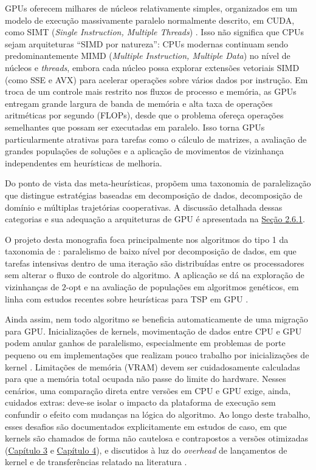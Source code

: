 GPUs oferecem milhares de núcleos relativamente simples, organizados em um modelo de execução massivamente paralelo normalmente descrito, em CUDA, como SIMT (\emph{Single Instruction, Multiple Threads}) \autocite{flynn1972taxonomy,nvidia2024cuda}.
Isso não significa que CPUs sejam arquiteturas ``SIMD por natureza'': CPUs modernas continuam sendo predominantemente MIMD (\emph{Multiple Instruction, Multiple Data}) no nível de núcleos e \emph{threads}, embora cada núcleo possa explorar extensões vetoriais SIMD (como SSE e AVX) para acelerar operações sobre vários dados por instrução.
Em troca de um controle mais restrito nos fluxos de processo e memória, as GPUs entregam grande largura de banda de memória e alta taxa de operações aritméticas por segundo (FLOPs), desde que o problema ofereça operações semelhantes que possam ser executadas em paralelo.
Isso torna GPUs particularmente atrativas para tarefas como o cálculo de matrizes, a avaliação de grandes populações de soluções e a aplicação de movimentos de vizinhança independentes em heurísticas de melhoria.

Do ponto de vista das meta-heurísticas, \textcite{crainic2003parallel} propõem uma taxonomia de paralelização que distingue estratégias baseadas em decomposição de dados, decomposição de domínio e múltiplas trajetórias cooperativas.
A discussão detalhada dessas categorias e sua adequação a arquiteturas de GPU é apresentada na \hyperref[sec-261-taxonomia-paralelizacao]{Seção 2.6.1}.

O projeto desta monografia foca principalmente nos algoritmos do tipo 1 da taxonomia de \textcite{crainic2003parallel}: paralelismo de baixo nível por decomposição de dados, em que tarefas intensivas dentro de uma iteração são distribuídas entre os processadores sem alterar o fluxo de controle do algoritmo.
A aplicação se dá na exploração de vizinhanças de \(2\)-opt e na avaliação de populações em algoritmos genéticos, em linha com estudos recentes sobre heurísticas para TSP em GPU \autocite{schulz2013gpu,tsp_gpu,fujimoto2011highly}.

Ainda assim, nem todo algoritmo se beneficia automaticamente de uma migração para GPU.
Inicializações de kernels, movimentação de dados entre CPU e GPU podem anular ganhos de paralelismo, especialmente em problemas de porte pequeno ou em implementações que realizam pouco trabalho por inicializações de kernel \autocite{van2013gpu,luong2013gpu}. Limitações de memória (VRAM) devem ser cuidadosamente calculadas para que a memória total ocupada não passe do limite do hardware.
Nesses cenários, uma comparação direta entre versões em CPU e GPU exige, ainda, cuidados extras: deve-se isolar o impacto da plataforma de execução sem confundir o efeito com mudanças na lógica do algoritmo.
Ao longo deste trabalho, esses desafios são documentados explicitamente em estudos de caso, em que kernels são chamados de forma não cautelosa e contrapostos a versões otimizadas (\hyperref[cap3-materiais-metodos]{Capítulo 3} e \hyperref[cap4-resultados]{Capítulo 4}), e discutidos à luz do \emph{overhead} de lançamentos de kernel e de transferências relatado na literatura \autocite{van2013gpu,luong2013gpu}.

